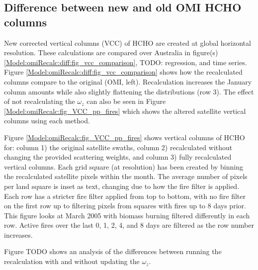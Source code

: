   \subsection{Difference between new and old OMI HCHO columns}
  
    
    New corrected vertical columns (VCC) of HCHO are created at global \highhr horizontal resolution.
    These calculations are compared over Australia in figure(s) \ref{Model:omiRecalc:diff:fig_vcc_comparison}, TODO: regression, and time series.
    Figure \ref{Model:omiRecalc:diff:fig_vcc_comparison} shows how the recalculated columns compare to the original (OMI, left). 
    Recalculation increases the January column amounts while also slightly flattening the distributions (row 3).
    The effect of not recalculating the $\omega_z$ can also be seen in Figure \ref{Model:omiRecalc:fig_VCC_pp_fires} which shows the altered satellite vertical columns using each method.
    
    Figure \ref{Model:omiRecalc:fig_VCC_pp_fires} shows vertical columns of HCHO for: column 1) the original satellite swaths, column 2) recalculated without changing the provided scattering weights, and column 3) fully recalculated vertical columns. 
    Each grid square (at \highhr resolution) has been created by binning the recalculated satellite pixels within the month.
    The average number of pixels per land square is inset as text, changing due to how the fire filter is applied.
    Each row has a stricter fire filter applied from top to bottom, with no fire filter on the first row up to filtering pixels from squares with fires up to 8 days prior.
    This figure looks at March 2005 with biomass burning filtered differently in each row.
    Active fires over the last 0, 1, 2, 4, and 8 days are filtered as the row number increases.
    
    
    Figure TODO shows an analysis of the differences between running the recalculation with and without updating the $\omega_z$.
    

